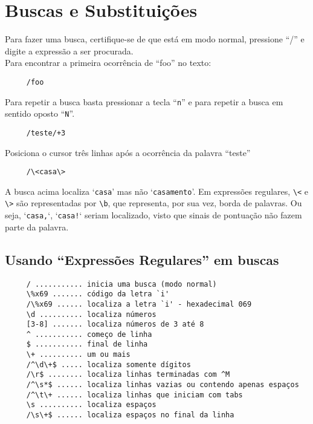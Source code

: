 
\chapter{Buscas e Substituições}\label{cha:Buscas e substituições}

Para fazer uma busca, certifique-se de que está em modo normal,
pressione ``/'' e digite a expressão a ser procurada. \\


Para encontrar a primeira ocorrência de ``foo'' no texto:

\begin{verbatim}
     /foo
\end{verbatim}

Para repetir a busca basta pressionar a tecla ``\verb+n+'' e para
repetir a busca em sentido oposto ``\verb+N+''.

\begin{verbatim}
     /teste/+3
\end{verbatim}

Posiciona o cursor três linhas após a ocorrência da palavra ``teste'' \\

\begin{verbatim}
     /\<casa\>
\end{verbatim}

A busca acima localiza `{\tt casa}' mas não `{\tt casamento}'. Em expressões
regulares, \verb|\<| e \verb|\>| são representadas por \verb|\b|, que representa, por sua vez, borda
de palavras. Ou seja, `{\tt casa,}`, `{\tt casa!}` seriam localizado, visto que sinais
de pontuação não fazem parte da palavra.


\section{Usando ``Expressões Regulares'' em buscas}
\label{Usando ``Expressões Regulares'' em buscas}

\begin{verbatim}
     / ........... inicia uma busca (modo normal)
     \%x69 ....... código da letra `i'
     /\%x69 ...... localiza a letra `i' - hexadecimal 069
     \d .......... localiza números
     [3-8] ....... localiza números de 3 até 8
     ^ ........... começo de linha
     $ ........... final de linha
     \+ .......... um ou mais
     /^\d\+$ ..... localiza somente dígitos
     /\r$ ........ localiza linhas terminadas com ^M
     /^\s*$ ...... localiza linhas vazias ou contendo apenas espaços
     /^\t\+ ...... localiza linhas que iniciam com tabs
     \s .......... localiza espaços
     /\s\+$ ...... localiza espaços no final da linha
\end{verbatim}

